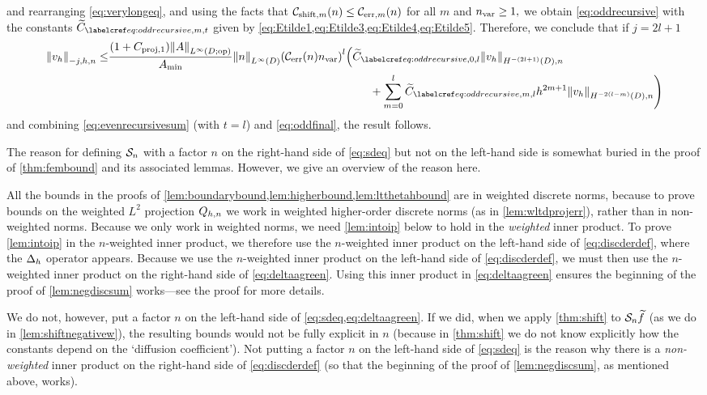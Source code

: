 and rearranging \cref{eq:verylongeq}, and using the facts that $\shiftn{m} \leq \errn{m}$ for all $m$ and $n_{\mathrm{var}} \geq 1,$ we obtain \cref{eq:oddrecursive} with the constants $\Etildefn{m,t}$ given by \cref{eq:Etilde1,eq:Etilde3,eq:Etilde4,eq:Etilde5}. Therefore, we conclude that if $j = 2l+1$
\begin{align}
\Nfn{-j,h,n}{\vh} \leq& \frac{\mleft(1+\Cprojfn{1}\mright)\NLiDop{A}}{\Amin}\NLiD{n}\mleft(\En \nvar\mright)^{l}\mleft(\Etildefn{0,l} \NHnfn{-(2l+1)}{D}{\vh}\mright.\nonumber\\
&\mleft.\hphantom{\frac{\mleft(1+\Cprojfn{1}\mright)\NLiDop{A}}{\Amin}\NLiD{n}\mleft(\En \nvar\mright)^{l}}
\quad\quad+ \sum_{m=0}^{l} \Etildefn{m,l} h^{2m+1}  \NHnfn{-2(l-m)}{D}{\vh}\mright)\label{eq:oddfinal}
\end{align}
and combining \cref{eq:evenrecursivesum} (with $t=l$) and \cref{eq:oddfinal}, the result follows.%
\epf

\label{rem:why}
The reason for defining $\mathcal S_{n}$ with a factor $n$ on the right-hand side of \cref{eq:sdeq} but not on the left-hand side is somewhat buried in the proof of \cref{thm:fembound} and its associated lemmas. However, we give an overview of the reason here.

All the bounds in the proofs of \cref{lem:boundarybound,lem:higherbound,lem:ltthetahbound} are in weighted discrete norms, because to prove bounds on the weighted $L^2$ projection $Q_{h,n}$ we work in weighted higher-order discrete norms (as in \cref{lem:wltdprojerr}), rather than in non-weighted norms. Because we only work in weighted norms, we need \cref{lem:intoip} below to hold in the \emph{weighted} inner product. To prove \cref{lem:intoip} in the $n$-weighted inner product, we therefore use the $n$-weighted inner product on the left-hand side of \cref{eq:discderdef}, where the $\Delta_{h}$ operator appears. Because we use the $n$-weighted inner product on the left-hand side of \cref{eq:discderdef}, we must then use the $n$-weighted inner product on the right-hand side of \cref{eq:deltaagreen}. Using this inner product in \cref{eq:deltaagreen} ensures the beginning of the proof of \cref{lem:negdiscsum} works---see the proof for more details.

We do not, however, put a factor $n$ on the left-hand side of \cref{eq:sdeq,eq:deltaagreen}. If we did, when we apply \cref{thm:shift} to $\mathcal S_{n} \widetilde{f}$ (as we do in \cref{lem:shiftnegativew}), the resulting bounds would not be fully explicit in $n$ (because in \cref{thm:shift} we do not know explicitly how the constants depend on the `diffusion coefficient'). Not putting a factor $n$ on the left-hand side of \cref{eq:sdeq} is the reason why there is a \emph{non-weighted} inner product on the right-hand side of \cref{eq:discderdef} (so that the beginning of the proof of \cref{lem:negdiscsum}, as mentioned above, works).
\ere

